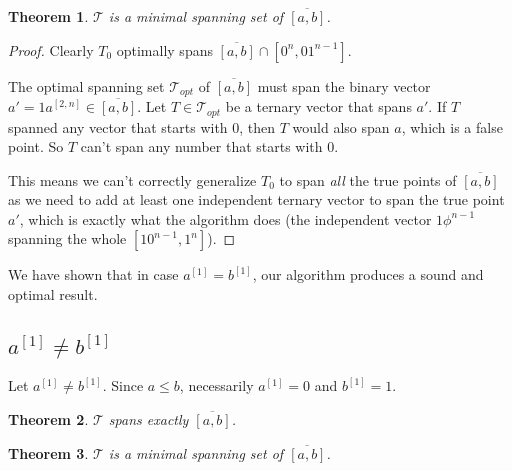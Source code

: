 \documentclass{article}
\theoremstyle{plain}
\newtheorem{theorem}{Theorem}[subsection]
\theoremstyle{definition}
\newcommand{\interval}[2]{[#1, #2]}
\newcommand{\finterval}[2]{\overline{\interval{#1}{#2}}}
\newcommand{\bit}[2]{#1^{[#2]}}
\newcommand{\bits}[3]{#1^{\interval{#2}{#3}}}
\begin{document}
\begin{theorem}
$\mathcal{T}$ is a minimal spanning set of $\finterval{a}{b}$.
\end{theorem}
\begin{proof}
Clearly $T_0$ optimally spans $\finterval{a}{b} \cap \interval{0^n}{0 1^{n-1}}$.

The optimal spanning set $\mathcal{T}_{opt}$ of $\finterval{a}{b}$
must span the binary vector $a' = 1 \bits{a}{2}{n} \in \finterval{a}{b}$.
Let $T \in \mathcal{T}_{opt}$ be a ternary vector that spans $a'$.
If $T$ spanned any vector that starts with $0$,
then $T$ would also span $a$,
which is a false point.
So $T$ can't span any number that starts with $0$.

This means we can't correctly generalize $T_0$
to span \emph{all} the true points of $\finterval{a}{b}$
as we need to add at least one independent ternary vector
to span the true point $a'$,
which is exactly what the algorithm does
(the independent vector $1 \phi^{n-1}$
spanning the whole $\interval{1 0^{n-1}}{1^n}$).
\end{proof}

We have shown that in case $\bit{a}{1} = \bit{b}{1}$,
our algorithm produces a sound and optimal result.

\subsection{$\bit{a}{1} \neq \bit{b}{1}$}
Let $\bit{a}{1} \neq \bit{b}{1}$.
Since $a \leq b$, necessarily $\bit{a}{1} = 0$ and $\bit{b}{1} = 1$.


\begin{theorem}
$\mathcal{T}$ spans exactly $\finterval{a}{b}$.
\end{theorem}

\begin{theorem}
$\mathcal{T}$ is a minimal spanning set of $\finterval{a}{b}$.
\end{theorem}




\printglossaries
\end{document}
